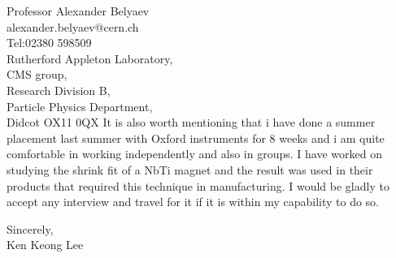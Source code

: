 \documentclass[10pt]{letter} %
\begin{document}
\begin{letter}{Professor Alexander Belyaev\\alexander.belyaev@cern.ch\\Tel:02380 598509\\Rutherford Appleton Laboratory,\\CMS group,\\Research Division B,\\Particle Physics Department,\\Didcot OX11 0QX}
It is also worth mentioning that i have done a summer placement last summer with Oxford instruments for 8 weeks and i am quite comfortable in working independently and also in groups. I have worked on studying the shrink fit of a NbTi magnet and the result was used in their products that required this technique in manufacturing. I would be gladly to accept any interview and travel for it if it is within my capability to do so.


\closing{Sincerely,\\Ken Keong Lee}




\end{letter}
\end{document}

